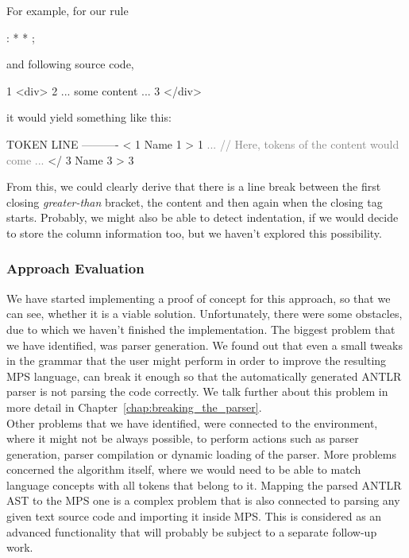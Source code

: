 \noindent
For example, for our  rule

\begin{antlr}
	  :   \literal{<}  * \literal{>} * \literal{</}  \literal{>} ;
\end{antlr}

\noindent
and following source code,

\begin{antlr}
	1   <div>
	2      ... some content ...
	3   </div>
\end{antlr}

\noindent
it would yield something like this:

\begin{antlr}
	TOKEN LINE
	----------
	<       1
	Name    1
	>       1
	\textcolor{gray}{...}
	\textcolor{gray}{// Here, tokens of the content would come}
	\textcolor{gray}{...}
	</      3
	Name    3
	>       3
\end{antlr}

From this, we could clearly derive that there is a line break between the first closing \textit{greater-than} bracket, the content and then again when the closing tag starts.
Probably, we might also be able to detect indentation, if we would decide to store the column information too, but we haven't explored this possibility.

\subsubsection{Approach Evaluation}

We have started implementing a proof of concept for this approach, so that we can see, whether it is a viable solution.
Unfortunately, there were some obstacles, due to which we haven't finished the implementation.
The biggest problem that we have identified, was parser generation.
We found out that even a small tweaks in the grammar that the user might perform in order to improve the resulting MPS language, can break it enough so that the automatically generated ANTLR parser is not parsing the code correctly.
We talk further about this problem in more detail in Chapter~\ref{chap:breaking_the_parser}.
\\

Other problems that we have identified, were connected to the environment, where it might not be always possible, to perform actions such as parser generation, parser compilation or dynamic loading of the parser.
More problems concerned the algorithm itself, where we would need to be able to match language concepts with all tokens that belong to it.
Mapping the parsed ANTLR AST to the MPS one is a complex problem that is also connected to parsing any given text source code and importing it inside MPS.
This is considered as an advanced functionality that will probably be subject to a separate follow-up work.
\\

